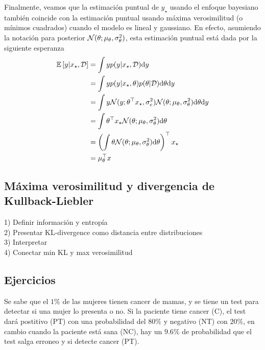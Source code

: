 Finalmente, veamos que la estimación puntual de $y_\star$ usando el enfoque bayesiano también coincide con la estimación puntual usando máxima verosimilitud (o mínimos cuadrados) cuando el modelo es lineal y gaussiano. En efecto, asumiendo la notación para posterior ${\mathcal N}(\theta;\mu_\theta, \sigma_\theta^2)$, esta estimación puntual está dada por la siguiente esperanza
\begin{align}
	\operatorname{\mathbb{E}}\left[y|x_\star,{\mathcal D}\right] 
	&= \int y p(y|x_\star,{\mathcal D}) {\text d} y \\
	&= \int y p(y|x_\star, \theta)p(\theta|{\mathcal D}) {\text d} \theta {\text d} y \nonumber\\
	&= \int y {\mathcal N}(y;\theta^\top x_\star ,\sigma_e^2){\mathcal N}(\theta;\mu_\theta, \sigma_\theta^2) {\text d}\theta {\text d} y \nonumber\\
	&= \int \theta^\top x_\star {\mathcal N}(\theta;\mu_\theta, \sigma_\theta^2) {\text d} \theta \nonumber\\
	&= \left(\int \theta {\mathcal N}(\theta;\mu_\theta, \sigma_\theta^2) {\text d} \theta\right)^\top x_\star \nonumber\\
	&= \mu_\theta^\top x \nonumber
\end{align}




\subsection{Máxima verosimilitud y divergencia de Kullback-Liebler}

\begin{mdframed}[style=pendiente, frametitle={\center Discusión}]
1) Definir información y entropía\\
2) Presentar KL-divergence como distancia entre distribuciones\\
3) Interpretar \\
4) Conectar min KL y max verosimilitud
	
\end{mdframed}








\subsection{Ejercicios} %
\label{sub:ejercicios_regresion_lineal}


Se sabe que el $1\%$ de las mujeres tienen cancer de mamas, y se tiene un test para detectar si una mujer lo presenta o no. Si la paciente tiene cancer (C), el test dará postitivo (PT) con una probabilidad del $80\%$ y negativo (NT) con $20\%$, en cambio cuando la paciente está sana (NC), hay un $9.6\%$ de probabilidad que el test salga erroneo y si detecte cancer (PT).

